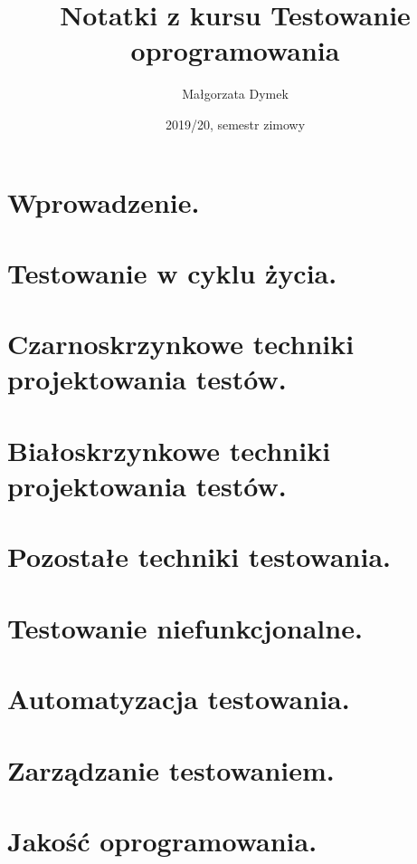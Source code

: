 \documentclass[a4paper]{article}
\title{Notatki z kursu Testowanie oprogramowania}
\author{Małgorzata Dymek}
\date{2019/20, semestr zimowy}
\begin{document}
    \maketitle

    \section{Wprowadzenie.}
    

    \section{Testowanie w cyklu życia.}
    

    \section{Czarnoskrzynkowe techniki projektowania testów.}
    
    

    \section{Białoskrzynkowe techniki projektowania testów.}
    
    

    \section{Pozostałe techniki testowania.}
    

    \section{Testowanie niefunkcjonalne.}
    

    \section{Automatyzacja testowania.}
    

    \section{Zarządzanie testowaniem.}
    
    

    \section{Jakość oprogramowania.}
    
\end{document}
